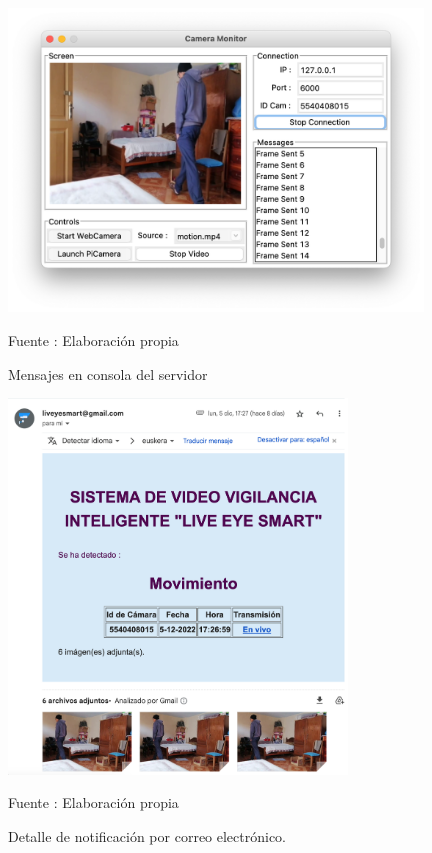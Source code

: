\begin{figure}[H]
    \begin{center}
        \includegraphics[width=11cm]{img/capitulo_6/motion.png}
    \end{center}
    \begin{center}
        \caption{Mensajes en consola del servidor}
        Fuente : Elaboración propia
    \end{center}
\end{figure}

\begin{figure}[H]
    \begin{center}
        \includegraphics[width=9cm]{img/capitulo_6/mail_motion.png}
    \end{center}
    \begin{center}
        \caption{Detalle de notificación por correo electrónico.}
        Fuente : Elaboración propia
    \end{center}
\end{figure}

